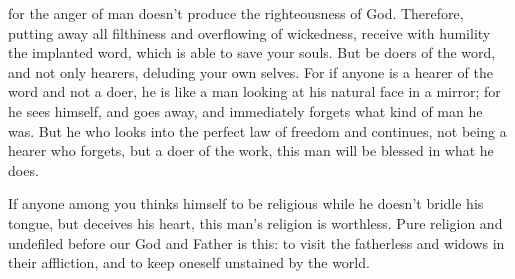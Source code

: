{for the anger of man doesn’t produce the righteousness of God.
Therefore, putting away all filthiness and overflowing of wickedness, receive with humility the implanted word, which is able to save your souls.
But be doers of the word, and not only hearers, deluding your own selves.
For if anyone is a hearer of the word and not a doer, he is like a man looking at his natural face in a mirror;
for he sees himself, and goes away, and immediately forgets what kind of man he was.
But he who looks into the perfect law of freedom and continues, not being a hearer who forgets, but a doer of the work, this man will be blessed in what he does.
\par }{\PP {}If anyone among you thinks himself to be religious while he doesn’t bridle his tongue, but deceives his heart, this man’s religion is worthless.
Pure religion and undefiled before our God and Father is this: to visit the fatherless and widows in their affliction, and to keep oneself unstained by the world.

}
